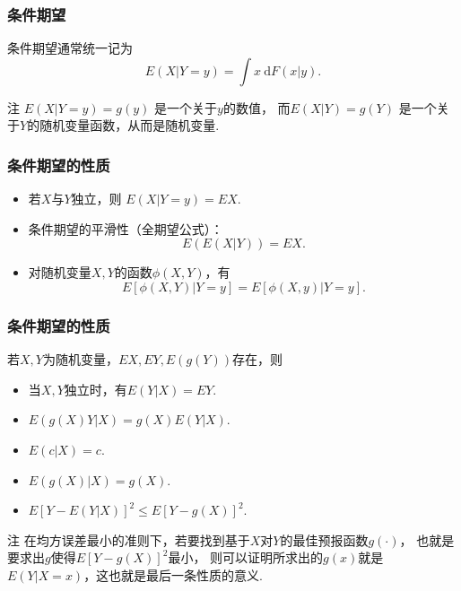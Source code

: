 \begin{frame}
    \frametitle{条件期望}
    条件期望通常统一记为
    \begin{equation*}
        E(X|Y=y)=\int x\ \mathrm dF(x|y).
    \end{equation*}
    \begin{block}{注}
        $E(X|Y=y)=g(y)$ 是一个关于$y$的数值，
        而$E(X|Y)=g(Y)$ 是一个关于$Y$的随机变量函数，从而是随机变量.  
    \end{block}
\end{frame}

\begin{frame}
    \frametitle{条件期望的性质}
    \begin{myproposition}
        \begin{itemize}
            \item 若$X$与$Y$独立，则 $E(X|Y=y)=EX$.
            \item 条件期望的平滑性（全期望公式）：
                \begin{equation}
                    E(E(X|Y))=EX.
                \end{equation}
            \item 对随机变量$X,Y$的函数$\phi(X,Y)$，有
                \begin{equation}
                    E[\phi(X,Y)|Y=y]=E[\phi(X,y)|Y=y].
                \end{equation}
        \end{itemize}
    \end{myproposition}
\end{frame}

\begin{frame}
    \frametitle{条件期望的性质}
    \begin{myproposition}
        若$X,Y$为随机变量，$EX,EY,E(g(Y))$存在，则
        \begin{itemize}
            \item 当$X,Y$独立时，有$E(Y|X)=EY$.
            \item $E(g(X)Y|X)=g(X)E(Y|X)$.
            \item $E(c|X)=c$.
            \item $E(g(X)|X)=g(X)$. 
            \item $E[Y-E(Y|X)]^2\leqslant E[Y-g(X)]^2$.
        \end{itemize}
    \end{myproposition}   
    \begin{block}{注}
        在均方误差最小的准则下，若要找到基于$X$对$Y$的最佳预报函数$g(\cdot)$，
        也就是要求出$g$使得$E[Y-g(X)]^2$最小，
        则可以证明所求出的$g(x)$就是$E(Y|X=x)$，这也就是最后一条性质的意义. 
    \end{block}
\end{frame}


